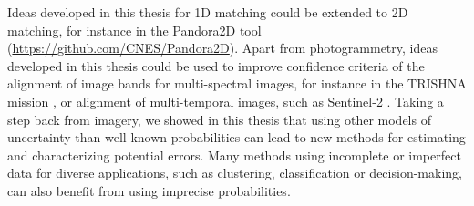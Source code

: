 Ideas developed in this thesis for 1D matching could be extended to 2D matching, for instance in the Pandora2D tool (\url{https://github.com/CNES/Pandora2D}). Apart from photogrammetry, ideas developed in this thesis could be used to improve confidence criteria of the alignment of image bands for multi-spectral images, for instance in the TRISHNA mission \cite{lagouarde_indo-french_2019}, or alignment of multi-temporal images, such as Sentinel-2 \cite{yan_sentinel-2a_2018}.
Taking a step back from imagery, we showed in this thesis that using other models of uncertainty than well-known probabilities can lead to new methods for estimating and characterizing potential errors. Many methods using incomplete or imperfect data for diverse applications, such as clustering, classification or decision-making, can also benefit from using imprecise probabilities.

\clearpage